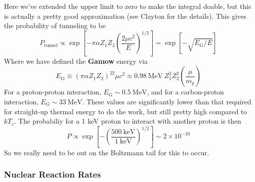 \documentclass[10pt]{article}
\numberwithin{equation}{section}
\begin{document}
  Here we've extended the upper limit to zero to make the integral
  doable, but this is actually a pretty good approximation (see
  Clayton for the details). This gives the probability of tunneling to
  be
  \begin{equation}
    \label{eq:118}
    P_{\mathrm{tunnel}}\propto \exp\left[-\pi\alpha
      Z_1Z_2\left(\frac{2\mu c^2}{E}\right)^{1/2}\right]=\exp\left[-\sqrt{E_\mathrm{G}/E}\right]
  \end{equation}
  Where we have defined the \textbf{Gamow} energy via
  \begin{equation}
    \label{eq:119}
    E_{\mathrm{G}}\equiv \left(\pi\alpha Z_1Z_2\right)^22\mu
    c^2\approx 0.98\ \mathrm{MeV}\ Z_1^2Z_2^2\left(\frac{\mu}{m_p}\right)
  \end{equation}
  For a proton-proton interaction, $E_{\mathrm{G}}\sim 0.5\
  \mathrm{MeV}$, and for a carbon-proton interaction,
  $E_{\mathrm{G}}\sim 33\ \mathrm{MeV}$. These values are
  significantly lower than that required for straight-up thermal
  energy to do the work, but still pretty high compared to $kT_c$. The
  probabiliy for a 1 keV proton to interact with another proton is
  then
  \begin{equation}
    \label{eq:120}
    P\propto \exp\left[-\left(\frac{500\ \mathrm{keV}}{1\
          \mathrm{keV}}\right)^{1/2}\right]\sim 2\times 10^{-10}
  \end{equation}
  So we really need to be out on the Boltzmann tail for this to occur.

  \subsubsection{Nuclear Reaction Rates}
  \label{sec:nucl-react-rates}
\end{document}
